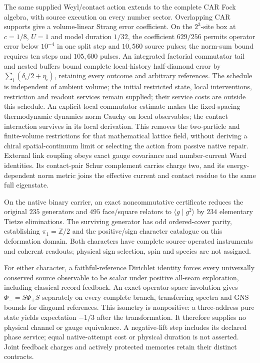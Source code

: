 The same supplied Weyl/contact action extends to the complete CAR Fock
algebra, with source execution on every number sector. Overlapping CAR
supports give a volume-linear Strang error coefficient. On the $2^3$-site
box at $c=1/8$, $U=1$ and model duration $1/32$, the coefficient $629/256$
permits operator error below $10^{-4}$ in one split step and $10{,}560$
source pulses; the norm-sum bound requires ten steps and $105{,}600$ pulses.
An integrated factorial commutator tail and nested buffers bound complete
local-history half-diamond error by $\sum_i(\delta_i/2+\eta_i)$, retaining
every outcome and arbitrary references. The schedule is independent of
ambient volume; the initial restricted state, local interventions,
restriction and readout services remain supplied; their service costs are
outside this schedule.
An explicit local commutator estimate makes
the fixed-spacing thermodynamic dynamics norm Cauchy on local observables;
the contact interaction survives in its local derivation. This removes the
two-particle and finite-volume restrictions for that mathematical lattice
field, without deriving a chiral spatial-continuum limit or selecting the
action from passive native repair. External link coupling obeys exact gauge
covariance and number-current Ward identities. Its contact-pair Schur
complement carries charge two, and its energy-dependent norm metric joins
the effective current and contact residue to the same full eigenstate.

On the native binary carrier, an exact noncommutative certificate reduces
the original $235$ generators and $495$ face/square relators to
$\langle g\mid g^2\rangle$ by $234$ elementary Tietze eliminations.
The surviving generator has odd ordered-cover parity, establishing
$\pi_1=\mathbb Z/2$ and the positive/sign character catalogue on this
deformation domain. Both characters have complete source-operated
instruments and coherent readouts; physical sign selection, spin and species
are not assigned.

For either character, a faithful-reference Dirichlet identity forces every
universally conserved source observable to be scalar under positive all-seam
exploration, including classical record feedback. An exact operator-space
involution gives $\Phi_-=S\Phi_+S$ separately on every complete branch,
transferring spectra and GNS bounds for diagonal references. This isometry
is nonpositive: a three-address pure state yields expectation $-1/3$ after
the transformation. It therefore supplies no physical channel or gauge
equivalence. A negative-lift step includes its declared phase service; equal
native-attempt cost or physical duration is not asserted. Joint feedback
charges and actively protected memories retain their distinct contracts.

